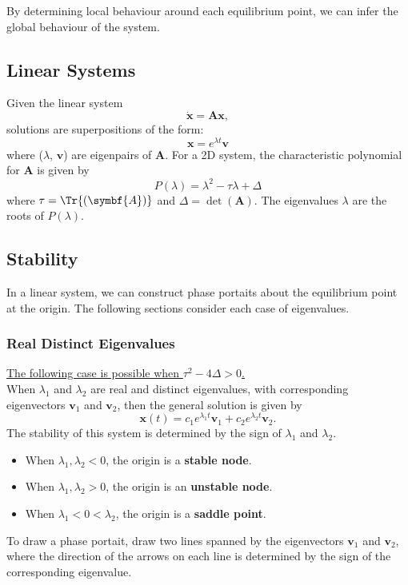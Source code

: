 \documentclass{article}
\begin{document}
By determining local behaviour around each equilibrium point, we can infer the global behaviour of the system.
\subsection{Linear Systems}
Given the linear system
\begin{equation*}
    \symbf{\dot{x}} = \symbf{A} \symbf{x},
\end{equation*}
solutions are superpositions of the form:
\begin{equation*}
    \symbf{x} = e^{\lambda t} \symbf{v}
\end{equation*}
where (\(\lambda\), \(\symbf{v}\)) are eigenpairs of \(\symbf{A}\).
For a 2D system, the characteristic polynomial for \(\symbf{A}\) is given by
\begin{equation*}
    P\left( \lambda \right) = \lambda^2 - \tau \lambda + \Delta
\end{equation*}
where \(\tau = \Tr{\left( \symbf{A} \right)}\) and \(\Delta = \det{\left( \symbf{A} \right)}\).
The eigenvalues \(\lambda\) are the roots of \(P\left( \lambda \right)\).
\subsection{Stability}
In a linear system, we can construct phase portaits about the equilibrium point at the origin.
The following sections consider each case of eigenvalues.
\subsubsection{Real Distinct Eigenvalues}
\underline{The following case is possible when \(\tau^2 - 4\Delta > 0\).} \\[1em]
When \(\lambda_1\) and \(\lambda_2\) are real and distinct eigenvalues,
with corresponding eigenvectors \(\symbf{v}_1\) and \(\symbf{v}_2\), then the general solution is given by
\begin{equation*}
    \symbf{x}\left( t \right) = c_1 e^{\lambda_1 t} \symbf{v}_1 + c_2 e^{\lambda_2 t} \symbf{v}_2.
\end{equation*}
The stability of this system is determined by the sign of \(\lambda_1\) and \(\lambda_2\).
\begin{itemize}
    \item When \(\lambda_1, \lambda_2 < 0\), the origin is a \textbf{stable node}.
    \item When \(\lambda_1, \lambda_2 > 0\), the origin is an \textbf{unstable node}.
    \item When \(\lambda_1 < 0 < \lambda_2\), the origin is a \textbf{saddle point}.
\end{itemize}
To draw a phase portait, draw two lines spanned by the eigenvectors \(\symbf{v}_1\) and \(\symbf{v}_2\),
where the direction of the arrows on each line is determined by the sign of the corresponding eigenvalue.
\end{document}
